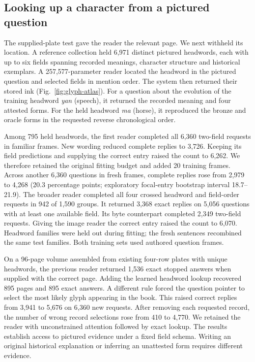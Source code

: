 \subsection*{Looking up a character from a pictured question}
The supplied-plate test gave the reader the relevant page. We next withheld its location. A reference collection held 6,971 distinct pictured headwords, each with up to six fields spanning recorded meanings, character structure and historical exemplars. A 257,577-parameter reader located the headword in the pictured question and selected fields in mention order. The system then returned their stored ink (Fig.~\ref{fig:glyph-atlas}). For a question about the evolution of the training headword \textit{yan} (speech), it returned the recorded meaning and four attested forms. For the held headword \textit{ma} (horse), it reproduced the bronze and oracle forms in the requested reverse chronological order.

Among 795 held headwords, the first reader completed all 6,360 two-field requests in familiar frames. New wording reduced complete replies to 3,726. Keeping its field predictions and supplying the correct entry raised the count to 6,262. We therefore retained the original fitting budget and added 20 training frames. Across another 6,360 questions in fresh frames, complete replies rose from 2,979 to 4,268 (20.3 percentage points; exploratory focal-entry bootstrap interval 18.7--21.9). The broader reader completed all four crossed headword and field-order requests in 942 of 1,590 groups. It returned 3,368 exact replies on 5,056 questions with at least one available field. Its byte counterpart completed 2,349 two-field requests. Giving the image reader the correct entry raised the count to 6,070. Headword families were held out during fitting; the fresh sentences recombined the same test families. Both training sets used authored question frames.

On a 96-page volume assembled from existing four-row plates with unique headwords, the previous reader returned 1,536 exact stopped answers when supplied with the correct page. Adding the learned headword lookup recovered 895 pages and 895 exact answers. A different rule forced the question pointer to select the most likely glyph appearing in the book. This raised correct replies from 3,941 to 5,676 on 6,360 new requests. After removing each requested record, the number of wrong record selections rose from 410 to 4,770. We retained the reader with unconstrained attention followed by exact lookup. The results establish access to pictured evidence under a fixed field schema. Writing an original historical explanation or inferring an unattested form requires different evidence.
